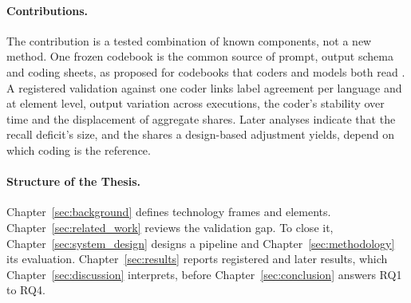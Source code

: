 \paragraph{Contributions.}
The contribution is a tested combination of known components, not a new method. One frozen codebook is the common source of prompt, output schema and coding sheets, as proposed for codebooks that coders and models both read \parencite[p.~192]{halterman2026codebookllms}. A registered validation against one coder links label agreement per language and at element level, output variation across executions, the coder's stability over time and the displacement of aggregate shares. Later analyses indicate that the recall deficit's size, and the shares a design-based adjustment yields, depend on which coding is the reference.

\paragraph{Structure of the Thesis.}
Chapter~\ref{sec:background} defines technology frames and elements. Chapter~\ref{sec:related_work} reviews the validation gap. To close it, Chapter~\ref{sec:system_design} designs a pipeline and Chapter~\ref{sec:methodology} its evaluation. Chapter~\ref{sec:results} reports registered and later results, which Chapter~\ref{sec:discussion} interprets, before Chapter~\ref{sec:conclusion} answers RQ1 to RQ4.
